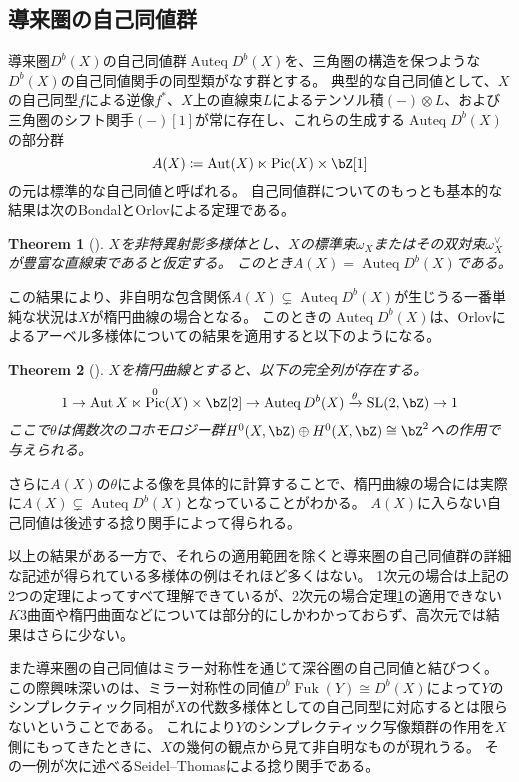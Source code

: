 \documentclass[uplatex,a4paper,dvipdfmx]{jsarticle}
\theoremstyle{plain}
\newtheorem{theorem}{Theorem}[section]
\theoremstyle{definition}
\DeclareMathOperator{\Auteq}{\mathrm{Auteq}}
\DeclareMathOperator{\Pic}{\mathrm{Pic}}
\DeclareMathOperator{\Aut}{\mathrm{Aut}}
\DeclareMathOperator{\SL}{\mathrm{SL}}
\DeclareMathOperator{\Fuk}{Fuk}
\begin{document}
\subsection{導来圏の自己同値群}
導来圏$D^b(X)$の自己同値群$\Auteq D^b(X)$を、三角圏の構造を保つような$D^b(X)$の自己同値関手の同型類がなす群とする。
典型的な自己同値として、$X$の自己同型$f$による逆像$f^*$、$X$上の直線束$L$によるテンソル積$(-)\otimes L$、および三角圏のシフト関手$(-)[1]$が常に存在し、これらの生成する$\Auteq D^b(X)$の部分群
\begin{equation}
	A(X) \coloneq \Aut(X) \ltimes \Pic(X) \times \bZ[1]
\end{equation}
の元は標準的な自己同値と呼ばれる。
自己同値群についてのもっとも基本的な結果は次のBondalとOrlovによる定理である。
\begin{theorem}[\cite{MR1818984}]\label{BO}
	$X$を非特異射影多様体とし、$X$の標準束$\omega_X$またはその双対束$\omega_X^\vee$が豊富な直線束であると仮定する。
	このとき$A(X) = \Auteq D^b(X)$である。
\end{theorem}
この結果により、非自明な包含関係$A(X) \subsetneq \Auteq D^b(X)$が生じうる一番単純な状況は$X$が楕円曲線の場合となる。
このときの$\Auteq D^b(X)$は、Orlovによるアーベル多様体についての結果を適用すると以下のようになる。
\begin{theorem}[\cite{MR1921811}]
	$X$を楕円曲線とすると、以下の完全列が存在する。
	\begin{equation}\label{eq:autoequivalence_of_elliptic_curve}
		1 \to \Aut{X} \ltimes \Pic^{0}(X)\times \bZ[2] \to \Auteq{D^b(X)} \xrightarrow{\theta} \SL(2, \bZ) \to 1
	\end{equation}
	ここで$\theta$は偶数次のコホモロジー群$H^0(X, \bZ) \oplus H^0(X, \bZ) \cong \bZ^2$への作用で与えられる。
\end{theorem}

さらに$A(X)$の$\theta$による像を具体的に計算することで、楕円曲線の場合には実際に$A(X) \subsetneq \Auteq D^b(X)$となっていることがわかる。
$A(X)$に入らない自己同値は後述する捻り関手によって得られる。

以上の結果がある一方で、それらの適用範囲を除くと導来圏の自己同値群の詳細な記述が得られている多様体の例はそれほど多くはない。
1次元の場合は上記の2つの定理によってすべて理解できているが、2次元の場合定理\ref{BO}の適用できない$K3$曲面や楕円曲面などについては部分的にしかわかっておらず、高次元では結果はさらに少ない。

また導来圏の自己同値はミラー対称性を通じて深谷圏の自己同値と結びつく。
この際興味深いのは、ミラー対称性の同値$D^b \Fuk(Y) \cong D^b (X)$によって$Y$のシンプレクティック同相が$X$の代数多様体としての自己同型に対応するとは限らないということである。
これにより$Y$のシンプレクティック写像類群の作用を$X$側にもってきたときに、$X$の幾何の観点から見て非自明なものが現れうる。
その一例が次に述べるSeidel--Thomasによる捻り関手である。
\end{document}
